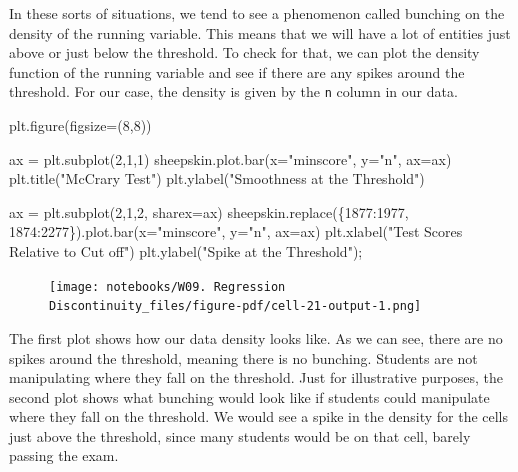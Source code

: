 \documentclass[
  letterpaper,
  DIV=11,
  numbers=noendperiod]{scrreprt}
\newenvironment{Shaded}{\begin{snugshade}}{\end{snugshade}}
\newcommand{\DecValTok}[1]{\textcolor[rgb]{0.68,0.00,0.00}{#1}}
\newcommand{\NormalTok}[1]{\textcolor[rgb]{0.00,0.23,0.31}{#1}}
\newcommand{\OperatorTok}[1]{\textcolor[rgb]{0.37,0.37,0.37}{#1}}
\newcommand{\StringTok}[1]{\textcolor[rgb]{0.13,0.47,0.30}{#1}}
\begin{document}
In these sorts of situations, we tend to see a phenomenon called
bunching on the density of the running variable. This means that we will
have a lot of entities just above or just below the threshold. To check
for that, we can plot the density function of the running variable and
see if there are any spikes around the threshold. For our case, the
density is given by the \texttt{n} column in our data.

\begin{Shaded}
\begin{Highlighting}[]
\NormalTok{plt.figure(figsize}\OperatorTok{=}\NormalTok{(}\DecValTok{8}\NormalTok{,}\DecValTok{8}\NormalTok{))}

\NormalTok{ax }\OperatorTok{=}\NormalTok{ plt.subplot(}\DecValTok{2}\NormalTok{,}\DecValTok{1}\NormalTok{,}\DecValTok{1}\NormalTok{)}
\NormalTok{sheepskin.plot.bar(x}\OperatorTok{=}\StringTok{"minscore"}\NormalTok{, y}\OperatorTok{=}\StringTok{"n"}\NormalTok{, ax}\OperatorTok{=}\NormalTok{ax)}
\NormalTok{plt.title(}\StringTok{"McCrary Test"}\NormalTok{)}
\NormalTok{plt.ylabel(}\StringTok{"Smoothness at the Threshold"}\NormalTok{)}

\NormalTok{ax }\OperatorTok{=}\NormalTok{ plt.subplot(}\DecValTok{2}\NormalTok{,}\DecValTok{1}\NormalTok{,}\DecValTok{2}\NormalTok{, sharex}\OperatorTok{=}\NormalTok{ax)}
\NormalTok{sheepskin.replace(\{}\DecValTok{1877}\NormalTok{:}\DecValTok{1977}\NormalTok{, }\DecValTok{1874}\NormalTok{:}\DecValTok{2277}\NormalTok{\}).plot.bar(x}\OperatorTok{=}\StringTok{"minscore"}\NormalTok{, y}\OperatorTok{=}\StringTok{"n"}\NormalTok{, ax}\OperatorTok{=}\NormalTok{ax)}
\NormalTok{plt.xlabel(}\StringTok{"Test Scores Relative to Cut off"}\NormalTok{)}
\NormalTok{plt.ylabel(}\StringTok{"Spike at the Threshold"}\NormalTok{)}\OperatorTok{;}
\end{Highlighting}
\end{Shaded}

\begin{figure}[H]

{\centering \texttt{[image: notebooks/W09. Regression Discontinuity\_files/figure-pdf/cell-21-output-1.png]}

}

\end{figure}

The first plot shows how our data density looks like. As we can see,
there are no spikes around the threshold, meaning there is no bunching.
Students are not manipulating where they fall on the threshold. Just for
illustrative purposes, the second plot shows what bunching would look
like if students could manipulate where they fall on the threshold. We
would see a spike in the density for the cells just above the threshold,
since many students would be on that cell, barely passing the exam.
\end{document}
